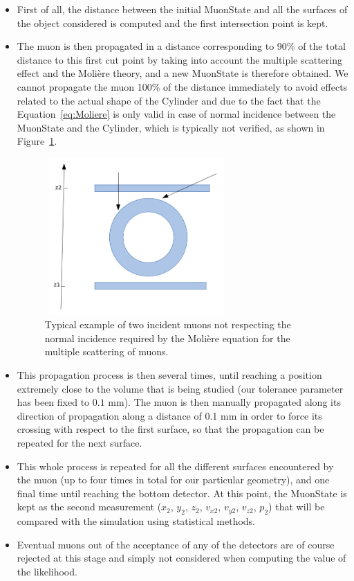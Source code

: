 \documentclass[a4paper, 11pt]{report}
\begin{document}
\begin{itemize}
\item First of all, the distance between the initial MuonState and all the surfaces of the object considered is computed and the first intersection point is kept.
\item The muon is then propagated in a distance corresponding to 90\% of the total distance to this first cut point by taking into account the multiple scattering effect and the Moli\`ere theory, and a new MuonState is therefore obtained. We cannot propagate the muon 100\% of the distance immediately to avoid effects related to the actual shape of the Cylinder and due to the fact that the Equation~\ref{eq:Moliere} is only valid in case of normal incidence between the MuonState and the Cylinder, which is typically not verified, as shown in Figure~\ref{fig:normal}.

\begin{figure}[htbp]
\centering
\begin{minipage}[b]{.49\textwidth}
\includegraphics[width=7cm, height=6cm]{figs/normal.png}
\end{minipage}\hfill
\caption{Typical example of two incident muons not respecting the normal incidence required by the Moli\`ere equation for the multiple scattering of muons.}
\label{fig:normal}
\end{figure}

\item This propagation process is then several times, until reaching a position extremely close to the volume that is being studied (our tolerance parameter has been fixed to $0.1$ mm). The muon is then manually propagated along its direction of propagation along a distance of 0.1 mm in order to force its crossing with respect to the first surface, so that the propagation can be repeated for the next surface.
\item This whole process is repeated for all the different surfaces encountered by the muon (up to four times in total for our particular geometry), and one final time until reaching the bottom detector. At this point, the MuonState is kept as the second measurement ($x_2$, $y_2$, $z_2$, $v_{x2}$, $v_{y2}$, $v_{z2}$, $p_2$) that will be compared with the simulation using statistical methods.
\item Eventual muons out of the acceptance of any of the detectors are of course rejected at this stage and simply not considered when computing the value of the likelihood.
\end{itemize}
\end{document}
